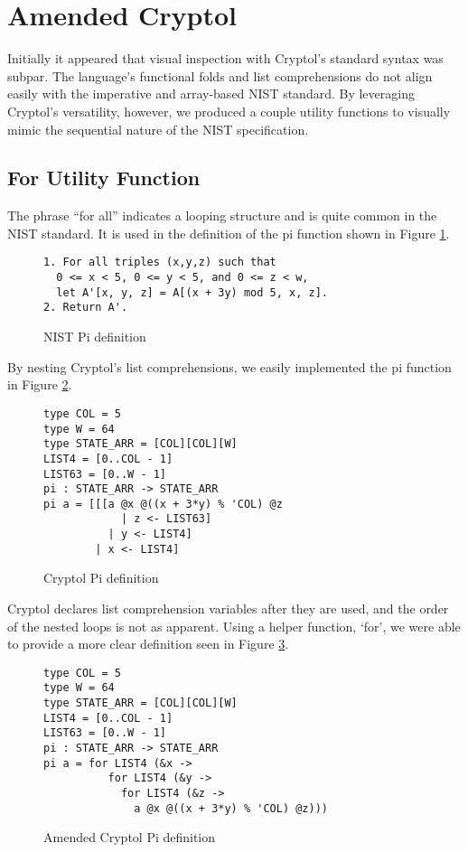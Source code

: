 \section{Amended Cryptol}
\label{sec:amended}
Initially it appeared that visual inspection with Cryptol’s standard syntax was subpar.
The language's functional folds and list comprehensions do not align easily with the imperative 
and array-based NIST standard. By leveraging Cryptol’s versatility, however, we produced a couple 
utility functions to visually mimic the sequential nature of the NIST specification. 

\subsection{For Utility Function}
The phrase “for all” indicates a looping structure and is quite common in the NIST standard. 
It is used in the definition of the pi function shown in Figure \ref{fig:nistPi}.

\begin{figure}[h]
  \centering
  \begin{lstlisting}[basewidth = {.5em},basicstyle={\scriptsize}]
1. For all triples (x,y,z) such that 
  0 <= x < 5, 0 <= y < 5, and 0 <= z < w,
  let A'[x, y, z] = A[(x + 3y) mod 5, x, z].
2. Return A'.
  \end{lstlisting}
  \caption{NIST Pi definition}
  \label{fig:nistPi}
\end{figure}
    
By nesting Cryptol's list comprehensions, we easily implemented the pi function in Figure 
\ref{fig:cryptolPi}. 

\begin{figure}[h]
  \centering
\begin{lstlisting}[language=Cryptol]
type COL = 5 
type W = 64
type STATE_ARR = [COL][COL][W]
LIST4 = [0..COL - 1]
LIST63 = [0..W - 1]
pi : STATE_ARR -> STATE_ARR
pi a = [[[a @x @((x + 3*y) % 'COL) @z 
            | z <- LIST63] 
          | y <- LIST4] 
        | x <- LIST4]
\end{lstlisting}
\caption{Cryptol Pi definition}
\label{fig:cryptolPi}
\end{figure}

Cryptol declares list comprehension variables after they are used, and the order of the
nested loops is not as apparent. Using a helper function, ‘for’, we were able to provide
a more clear definition seen in Figure \ref{fig:cryptolAmendedPi}.

\begin{figure}[h]
  \centering
\begin{lstlisting}[language=Cryptol]
type COL = 5 
type W = 64
type STATE_ARR = [COL][COL][W]
LIST4 = [0..COL - 1]
LIST63 = [0..W - 1]
pi : STATE_ARR -> STATE_ARR
pi a = for LIST4 (&x ->
          for LIST4 (&y -> 
            for LIST4 (&z -> 
              a @x @((x + 3*y) % 'COL) @z)))
\end{lstlisting}
\caption{Amended Cryptol Pi definition}
\label{fig:cryptolAmendedPi}
\end{figure}


